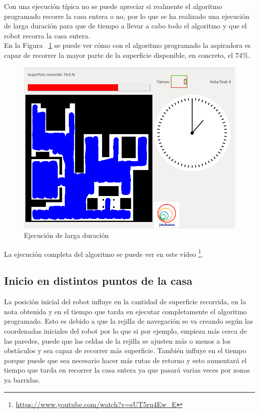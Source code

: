 Con una ejecución típica no se puede apreciar si realmente el algoritmo programado recorre la casa entera o no, por lo que se ha realizado una ejecución de larga duración para que de tiempo a llevar a cabo todo el algoritmo y que el robot recorra la casa entera.\\ 

En la Figura ~\ref{fig.sala} se puede ver cómo con el algoritmo programado la aspiradora es capaz de recorrer la mayor parte de la superficie disponible, en concreto, el 74\%.

\begin{figure}[H]
  \begin{center}
    \includegraphics[width=1.0\textwidth]{figures/Vacuum/refereeSala.png}
		\caption{Ejecución de larga duración}
		\label{fig.sala}
		\end{center}
\end{figure}

La ejecución completa del algoritmo se puede ver en este vídeo \footnote{\url{https://www.youtube.com/watch?v=sUT5ru4Ew_E}}.

\subsection{Inicio en distintos puntos de la casa}

La posición inicial del robot influye en la cantidad de superficie recorrida, en la nota obtenida y en el tiempo que tarda en ejecutar completamente el algoritmo programado. Esto es debido a que la rejilla de navegación se va creando según las coordenadas iniciales del robot por lo que si por ejemplo, empieza más cerca de las paredes, puede que las celdas de la rejilla se ajusten más o menos a los obstáculos y sea capaz de recorrer más superficie. También influye en el tiempo porque puede que sea necesario hacer más rutas de retorno y esto aumentará el tiempo que tarda en recorrer la casa entera ya que pasará varias veces por zonas ya barridas.\\

